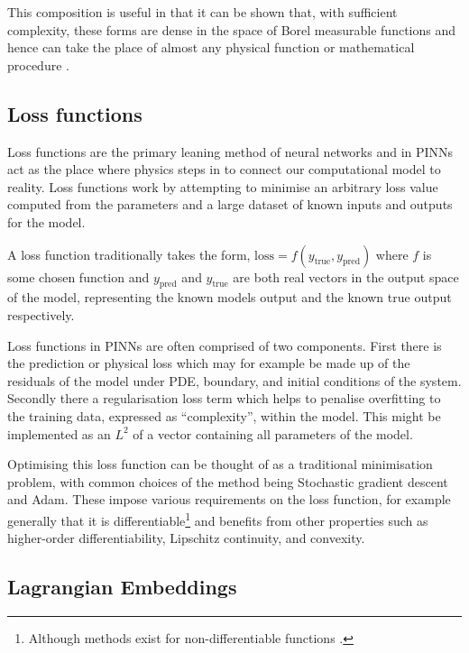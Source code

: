 This composition is useful in that it can be shown that, with sufficient complexity, these forms are dense in the space of Borel measurable functions and hence can take the place of almost any physical function or mathematical procedure \cite{hornikMultilayerFeedforwardNetworks1989}.

\subsection{Loss functions}
\label{sec:intro-lf}

Loss functions are the primary leaning method of neural networks and in PINNs act as the place where physics steps in to connect our computational model to reality. Loss functions work by attempting to minimise an arbitrary loss value computed from the parameters and a large dataset of known inputs and outputs for the model.

A loss function traditionally takes the form, $\mathrm{loss} = f(y_{\text{true}}, y_{\text{pred}})$ where $f$ is some chosen function and $y_{\text{pred}}$ and $y_{\text{true}}$ are both real vectors in the output space of the model, representing the known models output and the known true output respectively.

Loss functions in PINNs are often comprised of two components. First there is the prediction or physical loss which may for example be made up of the residuals of the model under PDE, boundary, and initial conditions of the system. Secondly there a regularisation loss term which helps to penalise overfitting to the training data, expressed as \enquote{complexity}, within the model. This might be implemented as an $L^2$  of a vector containing all parameters of the model.

Optimising this loss function can be thought of as a traditional minimisation problem, with common choices of the method being Stochastic gradient descent and Adam\cite{kingmaAdamMethodStochastic2017}. These impose various requirements on the loss function, for example generally that it is differentiable\footnote{Although methods exist for non-differentiable functions \cite{daubechiesIterativeThresholdingAlgorithm2003}.} and benefits from other properties such as higher-order differentiability, Lipschitz continuity, and convexity\cite{sraOptimizationMachineLearning2012}.

\subsection{Lagrangian Embeddings}

